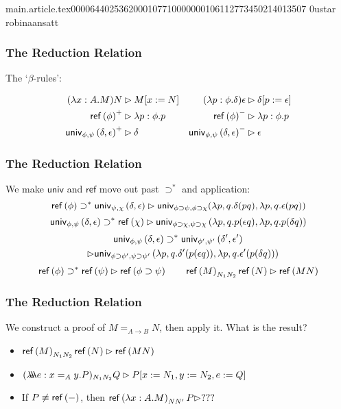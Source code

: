 main.article.tex                                                                                    0000644 0253620 0010771 00000001061 12773450214 013507  0                                                                                                    ustar   robina                          ansatt                                                                                                                                                                                                                 \documentclass{article}
\begin{document}
\begin{frame}[fragile]
\frametitle{The Reduction Relation}
The `$\beta$-rules':

\begin{align*}
(\lambda x:A.M)N & \rhd M[x:=N] & (\lambda p:\phi.\delta)\epsilon & \rhd \delta[p:=\epsilon] \\
 \mathsf{ref} \left( {\phi} \right)^+ & \rhd \lambda p:\phi.p & \mathsf{ref} \left( {\phi} \right)^- & \rhd \lambda p:\phi.p \\
\mathsf{univ}_{{\phi} , {\psi}} \left( {\delta} , {\epsilon} \right)^+ & \rhd \delta & \mathsf{univ}_{{\phi} , {\psi}} \left( {\delta} , {\epsilon} \right)^- & \rhd \epsilon
\end{align*}
\end{frame}

\begin{frame}[fragile]
\frametitle{The Reduction Relation}
We make $\mathsf{univ}$ and $\mathsf{ref}$ move out past $\supset^*$ and application:
$$\mathsf{ref} \left( {\phi} \right) \supset^* \mathsf{univ}_{{\psi} , {\chi}} \left( {\delta} , {\epsilon} \right)
\rhd \mathsf{univ}_{\phi \supset \psi,\phi \supset \chi}(\lambda p, q . \delta (p q), \lambda p, q . \epsilon (p q))$$
$$\mathsf{univ}_{{\phi} , {\psi}} \left( {\delta} , {\epsilon} \right) \supset^* \mathsf{ref} \left( {\chi} \right)
\rhd \mathsf{univ}_{{\phi \supset \chi} , {\psi \supset \chi}} \left( {\lambda p,q .p (\epsilon q)} , {\lambda p,q .p (\delta q)} \right)$$
\begin{gather*}
\mathsf{univ}_{{\phi} , {\psi}} \left( {\delta} , {\epsilon} \right) \supset^* \mathsf{univ}_{{\phi'} , {\psi'}} \left( {\delta'} , {\epsilon'} \right) \\
\quad \rhd \mathsf{univ}_{{\phi \supset \phi'} , {\psi \supset \psi'}} \left( {\lambda p,q . \delta' (p (\epsilon q))} , {\lambda p, q . \epsilon' (p (\delta q))} \right)
\end{gather*}
$$\mathsf{ref} \left( {\phi} \right) \supset^* \mathsf{ref} \left( {\psi} \right) \rhd \mathsf{ref} \left( {\phi \supset \psi} \right)
\qquad
\mathsf{ref} \left( {M} \right)_{N_1N_2} \mathsf{ref} \left( {N} \right) \rhd \mathsf{ref} \left( {MN} \right)$$
\end{frame}

\begin{frame}[fragile]
\frametitle{The Reduction Relation}
We construct a proof of $M =_{A \rightarrow B} N$, then apply it.  What is the result?
\begin{itemize}[<+->]
\item
$\mathsf{ref} \left( {M} \right)_{N_1N_2} \mathsf{ref} \left( {N} \right) \rhd \mathsf{ref} \left( {MN} \right)$
\item
$(\lambda \!\! \lambda \!\! \lambda e:x =_A y. P)_{N_1N_2}Q \rhd P[x:=N_1, y:=N_2, e:=Q]$
\item
If $P \not\equiv \mathsf{ref} \left( {-} \right)$, then $\mathsf{ref} \left( {\lambda x:A.M} \right)_{NN'} P \rhd ???$
\end{itemize}

\end{frame}
\end{document}
